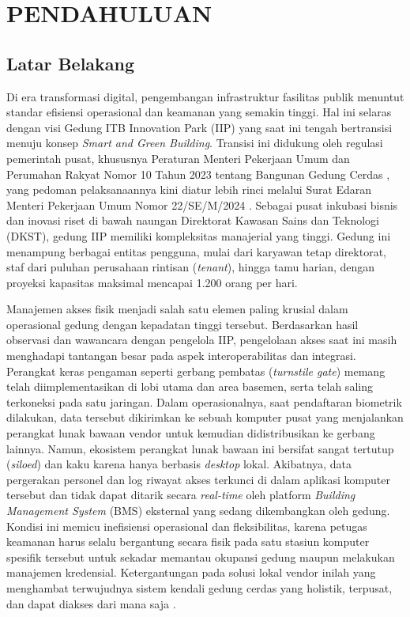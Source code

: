 \cleardoublepage %
\chapter{PENDAHULUAN}
\label{chap:pendahuluan}
\section{Latar Belakang}

Di era transformasi digital, pengembangan infrastruktur fasilitas publik menuntut standar efisiensi operasional dan keamanan yang semakin tinggi. Hal ini selaras dengan visi Gedung ITB Innovation Park (IIP) yang saat ini tengah bertransisi menuju konsep \textit{Smart and Green Building}. Transisi ini didukung oleh regulasi pemerintah pusat, khususnya Peraturan Menteri Pekerjaan Umum dan Perumahan Rakyat Nomor 10 Tahun 2023 tentang Bangunan Gedung Cerdas \autocite{PermenPUPR_10_2023}, yang pedoman pelaksanaannya kini diatur lebih rinci melalui Surat Edaran Menteri Pekerjaan Umum Nomor 22/SE/M/2024 \autocite{pu2024se22}. Sebagai pusat inkubasi bisnis dan inovasi riset di bawah naungan Direktorat Kawasan Sains dan Teknologi (DKST), gedung IIP memiliki kompleksitas manajerial yang tinggi. Gedung ini menampung berbagai entitas pengguna, mulai dari karyawan tetap direktorat, staf dari puluhan perusahaan rintisan (\textit{tenant}), hingga tamu harian, dengan proyeksi kapasitas maksimal mencapai 1.200 orang per hari. 

Manajemen akses fisik menjadi salah satu elemen paling krusial dalam operasional gedung dengan kepadatan tinggi tersebut. Berdasarkan hasil observasi dan wawancara dengan pengelola IIP, pengelolaan akses saat ini masih menghadapi tantangan besar pada aspek interoperabilitas dan integrasi. Perangkat keras pengaman seperti gerbang pembatas (\textit{turnstile gate}) memang telah diimplementasikan di lobi utama dan area basemen, serta telah saling terkoneksi pada satu jaringan. Dalam operasionalnya, saat pendaftaran biometrik dilakukan, data tersebut dikirimkan ke sebuah komputer pusat yang menjalankan perangkat lunak bawaan vendor untuk kemudian didistribusikan ke gerbang lainnya. Namun, ekosistem perangkat lunak bawaan ini bersifat sangat tertutup (\textit{siloed}) dan kaku karena hanya berbasis \textit{desktop} lokal. Akibatnya, data pergerakan personel dan log riwayat akses terkunci di dalam aplikasi komputer tersebut dan tidak dapat ditarik secara \textit{real-time} oleh platform \textit{Building Management System} (BMS) eksternal yang sedang dikembangkan oleh gedung. Kondisi ini memicu inefisiensi operasional dan fleksibilitas, karena petugas keamanan harus selalu bergantung secara fisik pada satu stasiun komputer spesifik tersebut untuk sekadar memantau okupansi gedung maupun melakukan manajemen kredensial. Ketergantungan pada solusi lokal vendor inilah yang menghambat terwujudnya sistem kendali gedung cerdas yang holistik, terpusat, dan dapat diakses dari mana saja \autocite{buildings14113446}.

